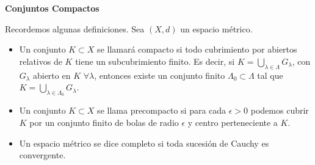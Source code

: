 \documentclass[a4,portrait]{seminar}
\newtheorem{thm}{Teorema}
\begin{document}
\begin{slide*}

\begin{center}
\begin{large}
    \textbf{Conjuntos Compactos}
\end{large}
\end{center}
Recordemos algunas definiciones. Sea $(X,d)$ un espacio m\'etrico.
\begin{itemize}
    \item[\ding{226}] Un conjunto $K\subset X$ se llamar\'a
    \colorbox{amar}{compacto} si todo cubrimiento por abiertos relativos  de $K$ tiene un
    subcubrimiento finito. Es decir, si
    $K = \bigcup_{\lambda\in\Lambda}G_{\lambda}$, con
    $G_{\lambda}$ abierto en $K$ $\forall\lambda$, entonces existe un
    conjunto finito $\Lambda_0\subset\Lambda$ tal que
    $K=\bigcup_{\lambda\in\Lambda_0}G_{\lambda}$.

    \item[\ding{226}] Un conjunto $K\subset X$ se llama
    \colorbox{amar}{precompacto} si para cada $\epsilon>0$ podemos cubrir $K$ por
    un conjunto finito de bolas de radio $\epsilon$ y centro perteneciente a $K$.

    \item[\ding{226}] Un espacio m\'etrico se dice \colorbox{amar}{completo} si
    toda sucesi\'on de Cauchy es convergente.

\end{itemize}

\end{slide*}
\end{document}
